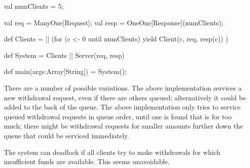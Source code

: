 \begin{answer}
\begin{scala}
{  val numClients = 5;

  val req = ManyOne[Request];
  val resp = OneOne[Response](numClients);
	  
  def Clients =
    || (for (c <- 0 until numClients) yield
          Client(c, req, resp(c)) )

  def System = Clients || Server(req, resp)

  def main(args:Array[String]) = System();
}
\end{scala}

There are a number of possible variations.  The above implementation services
a new withdrawal request, even if there are others queued; alternatively it
could be added to the back of the queue.  The above implementation only tries
to service queued withdrawal requests in queue order, until one is found that
is for too much; there might be withdrawal requests for smaller amounts
further down the queue that could be serviced immediately.

The system can deadlock if all clients try to make withdrawals for which
insufficient funds are available.  This seems unavoidable.
\end{answer}
	  
